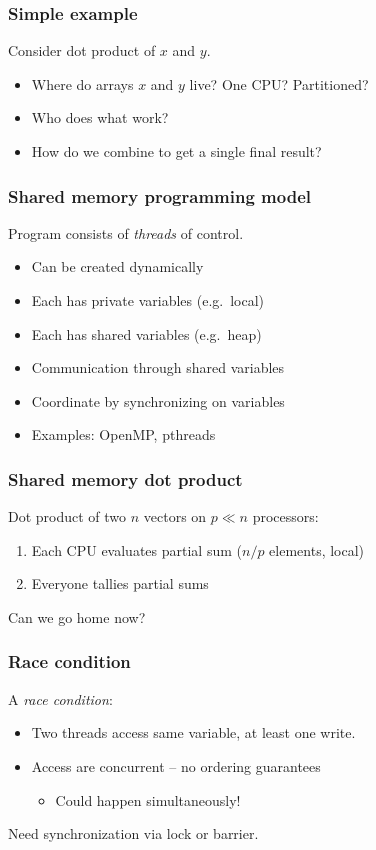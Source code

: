 \documentclass{beamer}
\begin{document}
\begin{frame}
  \frametitle{Simple example}

  Consider dot product of $x$ and $y$.
  \begin{itemize}
    \item Where do arrays $x$ and $y$ live?  One CPU?  Partitioned?
    \item Who does what work?
    \item How do we combine to get a single final result?
  \end{itemize}
\end{frame}


\begin{frame}
  \frametitle{Shared memory programming model}
  
  Program consists of {\em threads} of control.
  \begin{itemize}
  \item Can be created dynamically
  \item Each has private variables (e.g.~local)
  \item Each has shared variables (e.g.~heap)
  \item Communication through shared variables
  \item Coordinate by synchronizing on variables
  \item Examples: OpenMP, pthreads
  \end{itemize}
\end{frame}


\begin{frame}
  \frametitle{Shared memory dot product}
  
  Dot product of two $n$ vectors on $p \ll n$ processors:
  \begin{enumerate}
  \item Each CPU evaluates partial sum ($n/p$ elements, local)
  \item Everyone tallies partial sums
  \end{enumerate}
  Can we go home now?
\end{frame}


\begin{frame}
  \frametitle{Race condition}

  A {\em race condition}:
  \begin{itemize}
  \item Two threads access same variable, at least one write.
  \item Access are concurrent -- no ordering guarantees
    \begin{itemize}
    \item Could happen simultaneously!
    \end{itemize}
  \end{itemize}
  Need synchronization via lock or barrier.
\end{frame}
\end{document}
